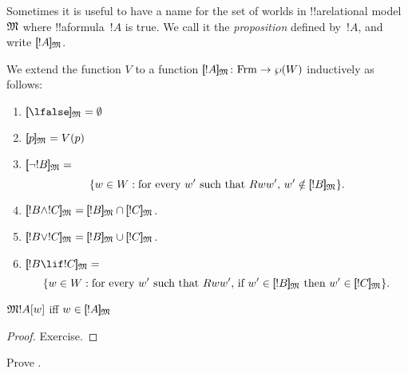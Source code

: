 \documentclass[../../../include/open-logic-section]{subfiles}
\begin{document}


Sometimes it is useful to have a name for the set of worlds in
!!a{relational model}~$\mModel{M}$ where !!a{formula}~$!A$ is true. We
call it the \emph{proposition} defined by~$!A$, and write
$\Prop{M}{!A}$. 

\begin{defn}
  We extend the function $V$ to a function $\Prop{M}{!A} \colon \Frm
  \to \Pow{W}$ inductively as follows:
  \begin{enumerate}
  \item $\Prop{M}{\lfalse} = \emptyset$
  \item $\Prop{M}{p} = V(p)$
  \item $\Prop{M}{\lnot !B} = {}$
    \[
      \Setabs{w \in W}{\text{for every $w'$ such that $Rww'$, $w'
          \notin \Prop{M}{!B}$}}.
    \]
  \item $\Prop{M}{!B \land !C} = \Prop{M}{!B} \cap \Prop{M}{!C}$.
  \item $\Prop{M}{!B \lor !C} = \Prop{M}{!B} \cup \Prop{M}{!C}$.
  \item $\Prop{M}{!B \lif !C} = {}$
    \[
      \Setabs{w \in W}{\text{for every $w'$ such that $Rww'$, if $w'
          \in \Prop{M}{!B}$ then $w' \in \Prop{M}{!C}$}}.
    \]
  \end{enumerate}
\end{defn}

\begin{prop}
  $\mModel{M}{!A}[w]$ iff $w \in \Prop{M}{!A}$
\end{prop}

\begin{proof}
  Exercise.
\end{proof}

\begin{prob}
  Prove .
\end{prob}
\end{document}
